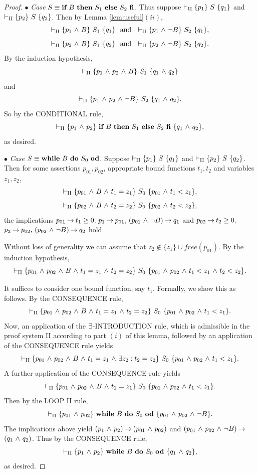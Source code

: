\documentclass[manuscript, screen, review]{acmart}
\begin{document}
\begin{proof}
\III

\NI
$\bullet$ \emph{Case} $S \equiv \ITE{B}{S_1}{S_2}$.
Thus suppose $\vdash_{\rm{II}} \HT{p_1}{S}{q_1}$ and
$\vdash_{\rm{II}} \HT{p_2}{S}{q_2}$.
Then by Lemma \ref{lem:useful}$(ii)$,
\[
 \vdash_{\rm{II}} \HT{p_{1}\A B}{S_1}{q_{1}} \ \mbox{ and }\
 \vdash_{\rm{II}} \HT{p_{1}\A \neg B}{S_2}{q_{1}},
\]
\[
 \vdash_{\rm{II}} \HT{p_{2} \A B}{S_1}{q_{2}} \ \mbox{ and }\
 \vdash_{\rm{II}} \HT{p_{2} \A \neg B}{S_2}{q_{2}}.
\]
By the induction hypothesis,
\[
 \vdash_{\rm{II}} \HT{p_{1}\A p_{2} \A B}{S_1}{q_{1} \A q_{2}}
\]
and
\[
 \vdash_{\rm{II}} \HT{p_{1}\A p_{2} \A \neg B}{S_2}{q_{1} \A q_{2}}.
\]
So by the CONDITIONAL rule,
\[
  \vdash_{\rm{II}} \HT{p_1 \A p_2}{\ITE{B}{S_1}{S_2}}{q_1 \A q_2},
\]
as desired.

\III

\NI
$\bullet$ \emph{Case} $S \equiv \WDD{B}{S_0}$.
Suppose $\vdash_{\rm{II}} \HT{p_1}{S}{q_1}$ and
$\vdash_{\rm{II}} \HT{p_2}{S}{q_2}$.
Then for some assertions $p_{01},p_{02}$, appropriate bound functions $t_1, t_2$ and
variables $z_1, z_2$,
\[
 \vdash_{\rm{II}} \HT{p_{01} \A B \A t_1 = z_1}{S_0}{p_{01} \A t_1 < z_1},
\]
\[
 \vdash_{\rm{II}} \HT{p_{02} \A B \A t_2 = z_2}{S_0}{p_{02} \A t_2 < z_2},
\]
the implications
$p_{01} \ra t_1 \ge 0, \, p_1 \ra p_{01}, \, (p_{01} \A \neg B) \ra q_1$
and
$p_{02} \ra t_2 \ge 0,$ $p_2 \ra p_{02}, \, (p_{02} \A \neg B) \ra q_2$
hold.

Without loss of generality we can assume that $z_2 \not \in \{z_1\} \cup \mathit{free}(p_{01})$.
By the induction hypothesis,
\[
 \vdash_{\rm{II}} \HT{p_{01} \A p_{02} \A B \A t_1 = z_1 \A t_2 = z_2}{S_0}
                     {p_{01} \A p_{02} \A t_1 < z_1 \A t_2 < z_2}.
\]

It suffices to consider one bound function, say $t_1$.
Formally, we show this as follows.
By the CONSEQUENCE rule,
\[
 \vdash_{\rm{II}} \HT{p_{01} \A p_{02} \A B \A t_1 = z_1 \A t_2 = z_2}{S_0}
                     {p_{01} \A p_{02} \A t_1 < z_1}.
\]
Now, an application of the $\te$-INTRODUCTION rule, which is admissible
in the proof system II according to part $(i)$ of this lemma, followed by an application
of the CONSEQUENCE rule yields
\[
 \vdash_{\rm{II}} \HT{p_{01} \A p_{02} \A B \A t_1 = z_1 \A \te z_2: t_2 = z_2}{S_0}
                     {p_{01} \A p_{02} \A t_1 < z_1}.
\]
A further application of the CONSEQUENCE rule yields
\[
 \vdash_{\rm{II}} \HT{p_{01} \A p_{02} \A B \A t_1 = z_1}{S_0}
                     {p_{01} \A p_{02} \A t_1 < z_1}.
\]
Then by the LOOP II rule,
\[
  \vdash_{\rm{II}} \HT{p_{01} \A p_{02}}{\WDD{B}{S_0}}{p_{01} \A p_{02} \A \neg B}.
\]
The implications above yield
$(p_1 \A p_2) \ra (p_{01} \A p_{02})$ and
$(p_{01} \A p_{02} \A \neg B) \ra$ $(q_1 \A q_2)$.
Thus by the CONSEQUENCE rule,
\[
 \vdash_{\rm{II}} \HT{p_1 \A p_2}{\WDD{B}{S_0}}{q_1 \A q_2},
\]
as desired.
\III


\end{proof}
\end{document}
